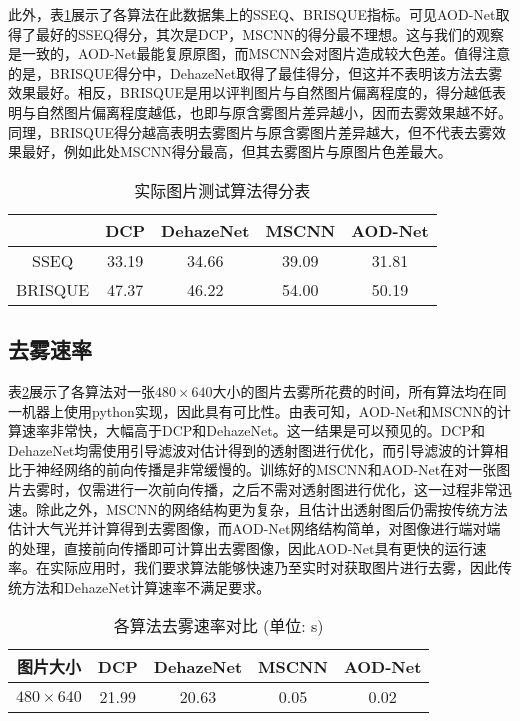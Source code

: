 \documentclass[a4paper, 12pt, oneside]{report}
\begin{document}
{此外，表\ref{tab:4.2}展示了各算法在此数据集上的SSEQ、BRISQUE指标。可见AOD-Net取得了最好的SSEQ得分，其次是DCP，MSCNN的得分最不理想。这与我们的观察是一致的，AOD-Net最能复原原图，而MSCNN会对图片造成较大色差。值得注意的是，BRISQUE得分中，DehazeNet取得了最佳得分，但这并不表明该方法去雾效果最好。相反，BRISQUE是用以评判图片与自然图片偏离程度的，得分越低表明与自然图片偏离程度越低，也即与原含雾图片差异越小，因而去雾效果越不好。同理，BRISQUE得分越高表明去雾图片与原含雾图片差异越大，但不代表去雾效果最好，例如此处MSCNN得分最高，但其去雾图片与原图片色差最大。
\begin{table}[htbp]
  \centering
  \caption{实际图片测试算法得分表}
    \begin{tabular}{c|c|c|c|c}
    \hline
         & DCP    & DehazeNet  & MSCNN    & AOD-Net \\
    \hline
    SSEQ & 33.19  & 34.66 &   39.09  & {\color{cyan} 31.81} \\
    \hline
     BRISQUE     &     47.37  &  {\color{cyan}46.22}     &  54.00 & 50.19 \\
     \hline
    \end{tabular}%
  \label{tab:4.2}%
\end{table}%

\subsection{去雾速率\quad}
表\ref{tab:4.3}展示了各算法对一张$480 \times 640$大小的图片去雾所花费的时间，所有算法均在同一机器上使用python实现，因此具有可比性。由表可知，AOD-Net和MSCNN的计算速率非常快，大幅高于DCP和DehazeNet。这一结果是可以预见的。DCP和DehazeNet均需使用引导滤波对估计得到的透射图进行优化，而引导滤波的计算相比于神经网络的前向传播是非常缓慢的。训练好的MSCNN和AOD-Net在对一张图片去雾时，仅需进行一次前向传播，之后不需对透射图进行优化，这一过程非常迅速。除此之外，MSCNN的网络结构更为复杂，且估计出透射图后仍需按传统方法估计大气光并计算得到去雾图像，而AOD-Net网络结构简单，对图像进行端对端的处理，直接前向传播即可计算出去雾图像，因此AOD-Net具有更快的运行速率。在实际应用时，我们要求算法能够快速乃至实时对获取图片进行去雾，因此传统方法和DehazeNet计算速率不满足要求。

\begin{table}[htbp]
\centering
\caption{各算法去雾速率对比 (单位: s)}
\begin{tabular}{c|c|c|c|c}
\hline
图片大小 & DCP & DehazeNet	& MSCNN	& AOD-Net \\
\hline
$480\times  640$ & 21.99 & 20.63 & 0.05 & 0.02\\
\hline
\end{tabular}
\label{tab:4.3}
\end{table}

}
\end{document}
